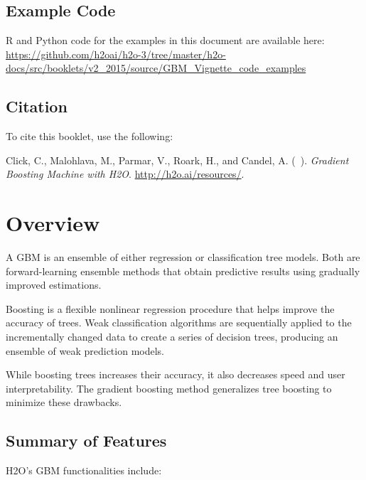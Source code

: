 






\subsection{Example Code}

R and Python code for the examples in this document are available here:\\
\url{https://github.com/h2oai/h2o-3/tree/master/h2o-docs/src/booklets/v2_2015/source/GBM_Vignette_code_examples}

\subsection{Citation}

To cite this booklet, use the following: 

Click, C., Malohlava, M., Parmar, V., Roark, H., and Candel, A. (\shortmonthname\ \the\year). \textit{Gradient Boosting Machine with H2O}. \url{http://h2o.ai/resources/}.


\section{Overview}

A GBM is an ensemble of either regression or classification tree models.
Both are forward-learning ensemble methods that obtain predictive results using gradually improved estimations.

Boosting is a flexible nonlinear regression procedure that helps improve the accuracy of trees. Weak classification algorithms are sequentially applied to the incrementally changed data to create a series of decision trees, producing an ensemble of weak prediction models. 

While boosting trees increases their accuracy, it also decreases speed and user interpretability.
The gradient boosting method generalizes tree boosting to minimize these drawbacks.

\subsection{Summary of Features}
H2O's GBM functionalities include:

